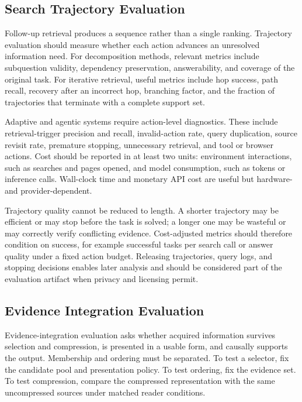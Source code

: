\subsection{Search Trajectory Evaluation}
\label{subsec:trajectory_evaluation}

Follow-up retrieval produces a sequence rather than a single ranking. Trajectory evaluation should measure whether each action advances an unresolved information need. For decomposition methods, relevant metrics include subquestion validity, dependency preservation, answerability, and coverage of the original task. For iterative retrieval, useful metrics include hop success, path recall, recovery after an incorrect hop, branching factor, and the fraction of trajectories that terminate with a complete support set.

Adaptive and agentic systems require action-level diagnostics. These include retrieval-trigger precision and recall, invalid-action rate, query duplication, source revisit rate, premature stopping, unnecessary retrieval, and tool or browser actions. Cost should be reported in at least two units: environment interactions, such as searches and pages opened, and model consumption, such as tokens or inference calls. Wall-clock time and monetary API cost are useful but hardware- and provider-dependent.

Trajectory quality cannot be reduced to length. A shorter trajectory may be efficient or may stop before the task is solved; a longer one may be wasteful or may correctly verify conflicting evidence. Cost-adjusted metrics should therefore condition on success, for example successful tasks per search call or answer quality under a fixed action budget. Releasing trajectories, query logs, and stopping decisions enables later analysis and should be considered part of the evaluation artifact when privacy and licensing permit.

\subsection{Evidence Integration Evaluation}
\label{subsec:integration_evaluation}

Evidence-integration evaluation asks whether acquired information survives selection and compression, is presented in a usable form, and causally supports the output. Membership and ordering must be separated. To test a selector, fix the candidate pool and presentation policy. To test ordering, fix the evidence set. To test compression, compare the compressed representation with the same uncompressed sources under matched reader conditions.

